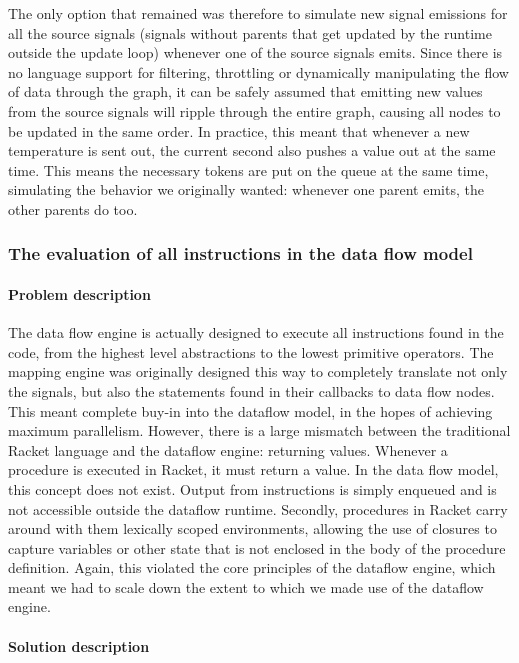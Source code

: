 The only option that remained was therefore to simulate new signal emissions for all the source signals (signals without parents that get updated by the runtime outside the update loop) whenever one of the source signals emits. Since there is no language support for filtering, throttling or dynamically manipulating the flow of data through the graph, it can be safely assumed that emitting new values from the source signals will ripple through the entire graph, causing all nodes to be updated in the same order. In practice, this meant that whenever a new temperature is sent out, the current second also pushes a value out at the same time. This means the necessary tokens are put on the queue at the same time, simulating the behavior we originally wanted: whenever one parent emits, the other parents do too.

\subsubsection{The evaluation of all instructions in the data flow model}

\paragraph{Problem description}

The data flow engine is actually designed to execute all instructions found in the code, from the highest level abstractions to the lowest primitive operators. The mapping engine was originally designed this way to completely translate not only the signals, but also the statements found in their callbacks to data flow nodes. This meant complete buy-in into the dataflow model, in the hopes of achieving maximum parallelism. However, there is a large mismatch between the traditional Racket language and the dataflow engine: returning values. Whenever a procedure is executed in Racket, it must return a value. In the data flow model, this concept does not exist. Output from instructions is simply enqueued and is not accessible outside the dataflow runtime. Secondly, procedures in Racket carry around with them lexically scoped environments, allowing the use of closures to capture variables or other state that is not enclosed in the body of the procedure definition. 
Again, this violated the core principles of the dataflow engine, which meant we had to scale down the extent to which we made use of the dataflow engine. 

\paragraph{Solution description}

